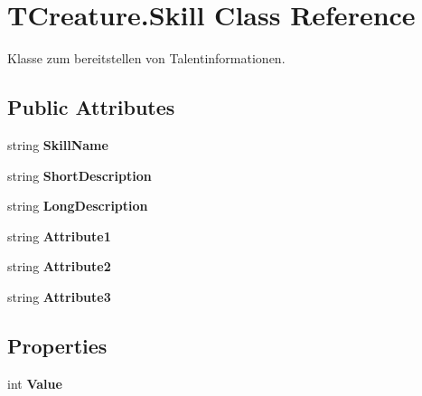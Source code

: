 \hypertarget{class_t_creature_1_1_skill}{}\section{T\+Creature.\+Skill Class Reference}
\label{class_t_creature_1_1_skill}


Klasse zum bereitstellen von Talentinformationen.  


\subsection*{Public Attributes}
\begin{DoxyCompactItemize}
\item 
\hypertarget{class_t_creature_1_1_skill_a8a2ead1b5705d48fc198a7294b939a42}{}string {\bfseries Skill\+Name}\label{class_t_creature_1_1_skill_a8a2ead1b5705d48fc198a7294b939a42}

\item 
\hypertarget{class_t_creature_1_1_skill_a9da49340ddedacd51f4f8936ab697dbf}{}string {\bfseries Short\+Description}\label{class_t_creature_1_1_skill_a9da49340ddedacd51f4f8936ab697dbf}

\item 
\hypertarget{class_t_creature_1_1_skill_acea798b9ff8f7c3dc9578d75742bc91d}{}string {\bfseries Long\+Description}\label{class_t_creature_1_1_skill_acea798b9ff8f7c3dc9578d75742bc91d}

\item 
\hypertarget{class_t_creature_1_1_skill_aa311711adfb1c1e51b97ef676dd213fe}{}string {\bfseries Attribute1}\label{class_t_creature_1_1_skill_aa311711adfb1c1e51b97ef676dd213fe}

\item 
\hypertarget{class_t_creature_1_1_skill_ab34467f1eff58d76ef718007aaf09b6c}{}string {\bfseries Attribute2}\label{class_t_creature_1_1_skill_ab34467f1eff58d76ef718007aaf09b6c}

\item 
\hypertarget{class_t_creature_1_1_skill_a3f18107a48ad421462707bbb97e3cc00}{}string {\bfseries Attribute3}\label{class_t_creature_1_1_skill_a3f18107a48ad421462707bbb97e3cc00}

\end{DoxyCompactItemize}
\subsection*{Properties}
\begin{DoxyCompactItemize}
\item 
\hypertarget{class_t_creature_1_1_skill_ad1c290ec68d22c6b93019cdd8eed7e15}{}int {\bfseries Value}\label{class_t_creature_1_1_skill_ad1c290ec68d22c6b93019cdd8eed7e15}

\end{DoxyCompactItemize}


